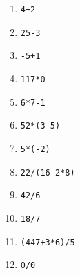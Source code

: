 \exer{}
\setcounter{numques}{0}

%
\begin{multicols}{2}
  \begin{enumerate}[label=\emph{\alph*)}]
    \item \texttt{4+2}
    \item \texttt{25-3}
    \item \texttt{-5+1}
    \item \texttt{117*0}
    \item \texttt{6*7-1}
    \item \texttt{52*(3-5)}
    \item \texttt{5*(-2)}
    \item \texttt{22/(16-2*8)}
    \item \texttt{42/6}
    \item \texttt{18/7}
    \item \texttt{(447+3*6)/5}
    \item \texttt{0/0}
  \end{enumerate}
\end{multicols}%


